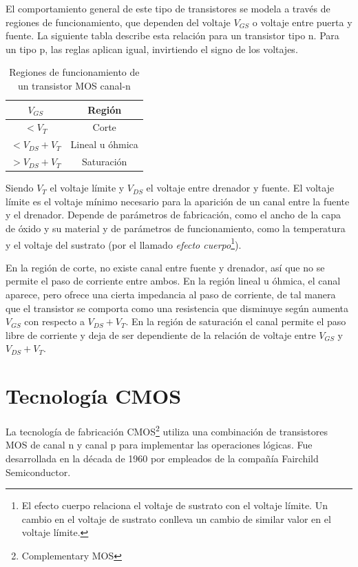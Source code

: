 \documentclass[12pt]{report} %
\begin{document}
	El comportamiento general de este tipo de transistores se modela a través de regiones de funcionamiento, que dependen del voltaje $V_{GS}$ o voltaje entre puerta y fuente.
	La siguiente tabla describe esta relación para un transistor tipo n. Para un tipo p, las reglas aplican igual, invirtiendo el signo de los voltajes.
	
	\begin{table}[H]\caption{Regiones de funcionamiento de un transistor MOS canal-n}\label{tb:n-channel-regions}
		\begin{tabular}{|c|c|}
			\hline
			$V_{GS}$ & Región \\
			\hline
			$< V_{T}$ & Corte \\
			\hline
			$< V_{DS} + V_{T}$ & Lineal u óhmica \\
			\hline
			$> V_{DS} + V_{T}$ & Saturación \\
			\hline
		\end{tabular}
	\end{table}

	Siendo $V_{T}$ el voltaje límite y $V_{DS}$ el voltaje entre drenador y fuente. El voltaje límite es el voltaje mínimo necesario para la aparición de un canal entre la fuente y el drenador. Depende de parámetros de fabricación, como el ancho de la capa de óxido y su material y de parámetros de funcionamiento, como la temperatura y el voltaje del sustrato (por el llamado \textit{efecto cuerpo}\footnote{El efecto cuerpo relaciona el voltaje de sustrato con el voltaje límite. Un cambio en el voltaje de sustrato conlleva un cambio de similar valor en el voltaje límite.}).
	
	En la región de corte, no existe canal entre fuente y drenador, así que no se permite el paso de corriente entre ambos. En la región lineal u óhmica, el canal aparece, pero ofrece una cierta impedancia al paso de corriente, de tal manera que el transistor se comporta como una resistencia que disminuye según aumenta $V_{GS}$ con respecto a $V_{DS} + V_{T}$. En la región de saturación el canal permite el paso libre de corriente y deja de ser dependiente de la relación de voltaje entre $V_{GS}$ y $V_{DS} + V_{T}$.
	
	\section{Tecnología CMOS}
	
	La tecnología de fabricación CMOS\footnote{Complementary MOS} utiliza una combinación de transistores MOS de canal n y canal p para implementar las operaciones lógicas. Fue desarrollada en la década de 1960 por empleados de la compañía Fairchild Semiconductor\cite{cmos-fairchild}.
	
\end{document}

